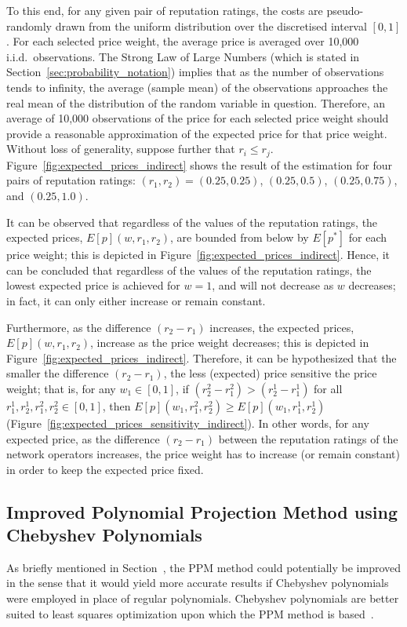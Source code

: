 To this end, for any given pair of reputation ratings, the costs are pseudo-randomly drawn from the uniform distribution over the discretised interval $[0,1]$. For each selected price weight, the average price is averaged over 10,000 i.i.d.~observations. The Strong Law of Large Numbers (which is stated in Section~\ref{sec:probability_notation}) implies that as the number of observations tends to infinity, the average (sample mean) of the observations approaches the real mean of the distribution of the random variable in question. Therefore, an average of 10,000 observations of the price for each selected price weight should provide a reasonable approximation of the expected price for that price weight. Without loss of generality, suppose further that $r_i \le r_j$. Figure~\ref{fig:expected_prices_indirect} shows the result of the estimation for four pairs of reputation ratings: $(r_1, r_2) = (0.25, 0.25)$, $(0.25, 0.5)$, $(0.25, 0.75)$, and $(0.25, 1.0)$.

It can be observed that regardless of the values of the reputation ratings, the expected prices, $E[p](w,r_1,r_2)$, are bounded from below by $E[p^*]$ for each price weight; this is depicted in Figure~\ref{fig:expected_prices_indirect}. Hence, it can be concluded that regardless of the values of the reputation ratings, the lowest expected price is achieved for $w=1$, and will not decrease as $w$ decreases; in fact, it can only either increase or remain constant.

Furthermore, as the difference $(r_2-r_1)$ increases, the expected prices, $E[p](w,r_1,r_2)$, increase as the price weight decreases; this is depicted in Figure~\ref{fig:expected_prices_indirect}. Therefore, it can be hypothesized that the smaller the difference $(r_2-r_1)$, the less (expected) price sensitive the price weight; that is, for any $w_1\in[0,1]$, if $(r^2_2-r^2_1) > (r^1_2-r^1_1)$ for all $r^1_1,r^1_2,r^2_1,r^2_2\in [0,1]$, then $E[p](w_1,r^2_1,r^2_2) \ge E[p](w_1,r^1_1,r^1_2)$ (Figure~\ref{fig:expected_prices_sensitivity_indirect}). In other words, for any expected price, as the difference $(r_2-r_1)$ between the reputation ratings of the network operators increases, the price weight has to increase (or remain constant) in order to keep the expected price fixed.

\subsection{Improved Polynomial Projection Method using Chebyshev Polynomials} %
\label{sub:improved_polynomial_projection_method_using_chebyshev_polynomials_indirect}
As briefly mentioned in Section~, the PPM method could potentially be improved in the sense that it would yield more accurate results if Chebyshev polynomials were employed in place of regular polynomials. Chebyshev polynomials are better suited to least squares optimization upon which the PPM method is based~\cite{MasonApproximation2003,Hubbard2011}.

